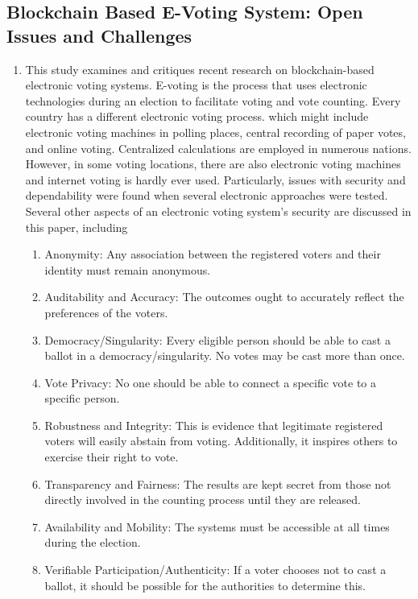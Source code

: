 \documentclass[10pt,final,journal,a4paper,oneside,twocolumn]{IEEEtran}
\begin{document}
		\subsection{Blockchain Based E-Voting System: Open Issues and Challenges \cite{khudoykulov2021blockchain}\cite{jafar2021blockchain}}
			\begin{enumerate}
				\item This study examines and critiques recent research on blockchain-based electronic voting systems. E-voting is the process that uses electronic technologies during an election to facilitate voting and vote counting. Every country has a different electronic voting process. which might include electronic voting machines in polling places, central recording of paper votes, and online voting. Centralized calculations are employed in numerous nations. However, in some voting locations, there are also electronic voting machines and internet voting is hardly ever used. Particularly, issues with security and dependability were found when several electronic approaches were tested. Several other aspects of an electronic voting system's security are discussed in this paper, including
					\begin{enumerate}
						\item Anonymity: Any association between the registered voters and their identity must remain anonymous.
						\item Auditability and Accuracy: The outcomes ought to accurately reflect the preferences of the voters.
						\item Democracy/Singularity: Every eligible person should be able to cast a ballot in a democracy/singularity. No votes may be cast more than once.
						\item Vote Privacy:  No one should be able to connect a specific vote to a specific person.
						\item Robustness and Integrity:  This is evidence that legitimate registered voters will easily abstain from voting. Additionally, it inspires others to exercise their right to vote.
						\item Transparency and Fairness:  The results are kept secret from those not directly involved in the counting process until they are released.
						\item Availability and Mobility: The systems must be accessible at all times during the election.
						\item Verifiable Participation/Authenticity: If a voter chooses not to cast a ballot, it should be possible for the authorities to determine this.

\end{enumerate}
\end{enumerate}
\end{document}
